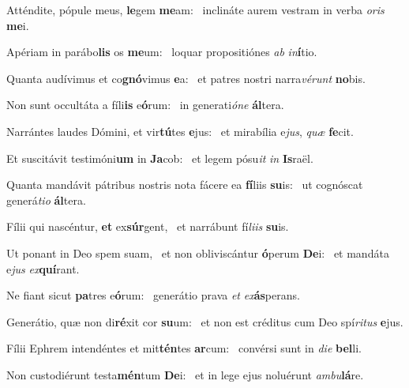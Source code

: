 \item Atténdite, pópule meus, \textbf{le}gem \textbf{me}am:~\psstar{} inclináte aurem vestram in verba \textit{oris} \textbf{me}i.

\item Apériam in parábo\textbf{lis} os \textbf{me}um:~\psstar{} loquar propositiónes \textit{ab} \textit{in}\textbf{í}tio.

\item Quanta audívimus et co\textbf{gnó}vimus \textbf{e}a:~\psstar{} et patres nostri narra\textit{vérunt} \textbf{no}bis.

\item Non sunt occultáta a fíli\textbf{is} e\textbf{ó}rum:~\psstar{} in generati\textit{óne} \textbf{ál}tera.

\item Narrántes laudes Dómini, et vir\textbf{tú}tes \textbf{e}jus:~\psstar{} et mirabília e\textit{jus}, \textit{quæ} \textbf{fe}cit.

\item Et suscitávit testimóni\textbf{um} in \textbf{Ja}cob:~\psstar{} et legem pósu\textit{it} \textit{in} \textbf{Is}raël.

\item Quanta mandávit pátribus nostris nota fácere ea \textbf{fí}liis \textbf{su}is:~\psstar{} ut cognóscat generá\textit{tio} \textbf{ál}tera.

\item Fílii qui nascéntur, \textbf{et} ex\textbf{súr}gent,~\psstar{} et narrábunt fí\textit{liis} \textbf{su}is.

\item Ut ponant in Deo spem suam,~\pscross{} et non obliviscántur \textbf{ó}perum \textbf{De}i:~\psstar{} et mandáta e\textit{jus} \textit{ex}\textbf{quí}rant.

\item Ne fiant sicut \textbf{pa}tres e\textbf{ó}rum:~\psstar{} generátio prava \textit{et} \textit{ex}\textbf{ás}perans.

\item Generátio, quæ non di\textbf{ré}xit cor \textbf{su}um:~\psstar{} et non est créditus cum Deo spí\textit{ritus} \textbf{e}jus.

\item Fílii Ephrem intendéntes et mit\textbf{tén}tes \textbf{ar}cum:~\psstar{} convérsi sunt in \textit{die} \textbf{bel}li.

\item Non custodiérunt testa\textbf{mén}tum \textbf{De}i:~\psstar{} et in lege ejus noluérunt \textit{ambu}\textbf{lá}re.

